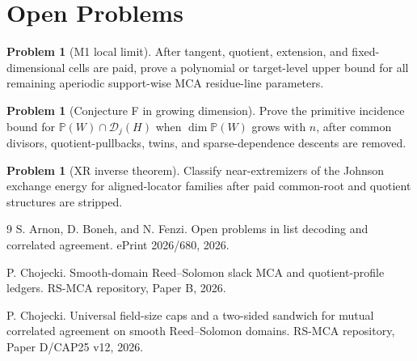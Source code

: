 \documentclass[11pt]{article}
\theoremstyle{definition}
\newtheorem{problem}[theorem]{Problem}
\theoremstyle{remark}
\newcommand{\D}{\mathcal D}
\newcommand{\PP}{\mathbb P}
\begin{document}
\section{Open Problems}

\begin{problem}[M1 local limit]
After tangent, quotient, extension, and fixed-dimensional cells are paid, prove
a polynomial or target-level upper bound for all remaining aperiodic
support-wise MCA residue-line parameters.
\end{problem}

\begin{problem}[Conjecture F in growing dimension]
Prove the primitive incidence bound for $\PP(W)\cap\D_j(H)$ when
$\dim\PP(W)$ grows with $n$, after common divisors, quotient-pullbacks, twins,
and sparse-dependence descents are removed.
\end{problem}

\begin{problem}[XR inverse theorem]
Classify near-extremizers of the Johnson exchange energy for aligned-locator
families after paid common-root and quotient structures are stripped.
\end{problem}

\begin{thebibliography}{9}
S. Arnon, D. Boneh, and N. Fenzi.
\newblock Open problems in list decoding and correlated agreement.
\newblock ePrint 2026/680, 2026.

P. Chojecki.
\newblock Smooth-domain Reed--Solomon slack MCA and quotient-profile ledgers.
\newblock RS-MCA repository, Paper B, 2026.

P. Chojecki.
\newblock Universal field-size caps and a two-sided sandwich for mutual
correlated agreement on smooth Reed--Solomon domains.
\newblock RS-MCA repository, Paper D/CAP25 v12, 2026.
\end{thebibliography}
\end{document}
